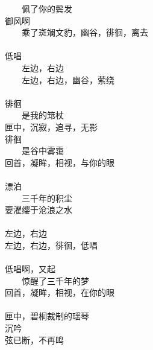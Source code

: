 　　佩了你的鬓发 \\
御风啊 \\
　　乘了斑斓文豹，幽谷，徘徊，离去 \\
\\
低唱 \\
　　左边，右边 \\
　　左边，右边，幽谷，萦绕 \\
\\
徘徊 \\
　　是我的筇杖 \\
匣中，沉寂，追寻，无影 \\
徘徊 \\
　　是谷中雾霭 \\
回首，凝眸，相视，与你的眼 \\
\\
漂泊 \\
　　三千年的积尘 \\
要濯缨于沧浪之水 \\
\\
左边，右边 \\
左边，右边，徘徊，低唱 \\
\\
低唱啊，又起 \\
　　惊醒了三千年的梦 \\
回首，凝眸，相视，在你的眼 \\
\\
匣中，碧桐裁制的瑶琴 \\
沉吟 \\
弦已断，不再鸣
